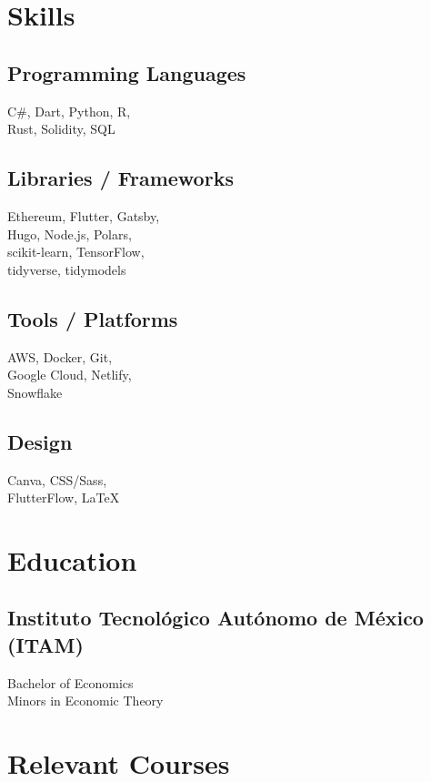 \documentclass[]{resume}
\begin{document}
\begin{minipage}[t]{0.25\textwidth} 


\section{Skills}
\subsection{Programming Languages}
\sectionsep
C\#,
Dart,
Python,
R, \\
Rust,
Solidity,
SQL
\sectionsep
\sectionsep
\subsection{Libraries / Frameworks}
\sectionsep
Ethereum,
Flutter,
Gatsby, \\
Hugo,
Node.js,
Polars, \\
scikit-learn,
TensorFlow, \\
tidyverse,
tidymodels
\sectionsep
\sectionsep
\subsection{Tools / Platforms}
AWS,
Docker,
Git, \\
Google Cloud,
Netlify, \\
Snowflake
\sectionsep
\sectionsep
\subsection{Design}
Canva,
CSS/Sass, \\
FlutterFlow,
LaTeX
\sectionsep
\sectionsep


\section{Education} 
\subsection{Instituto Tecnológico Autónomo de México (ITAM)}
\sectionsep
Bachelor of Economics \\
Minors in Economic Theory \\
\sectionsep
\sectionsep


\section{Relevant Courses} 

\end{minipage}
\end{document}
